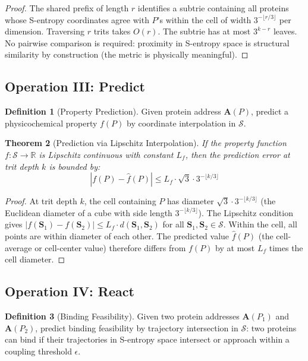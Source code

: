 \documentclass[11pt,twocolumn,a4paper]{article}
\newtheorem{theorem}{Theorem}[section]
\theoremstyle{definition}
\newtheorem{definition}[theorem]{Definition}
\theoremstyle{remark}
\newcommand{\Sspace}{\mathcal{S}}
\newcommand{\Real}{\mathbb{R}}
\begin{document}
\begin{proof}
The shared prefix of length $r$ identifies a subtrie containing all proteins whose S-entropy coordinates agree with $P$'s within the cell of width $3^{-\lfloor r/3 \rfloor}$ per dimension. Traversing $r$ trits takes $O(r)$. The subtrie has at most $3^{k-r}$ leaves. No pairwise comparison is required: proximity in S-entropy space is structural similarity by construction (the metric is physically meaningful).
\end{proof}

\subsection{Operation III: Predict}

\begin{definition}[Property Prediction]
\label{def:predict}
Given protein address $\mathbf{A}(P)$, predict a physicochemical property $f(P)$ by coordinate interpolation in $\Sspace$.
\end{definition}

\begin{theorem}[Prediction via Lipschitz Interpolation]
\label{thm:predict}
If the property function $f: \Sspace \to \Real$ is Lipschitz continuous with constant $L_f$, then the prediction error at trit depth $k$ is bounded by:
\begin{equation}
|f(P) - \hat{f}(P)| \leq L_f \cdot \sqrt{3} \cdot 3^{-\lfloor k/3 \rfloor}
\end{equation}
\end{theorem}

\begin{proof}
At trit depth $k$, the cell containing $P$ has diameter $\sqrt{3} \cdot 3^{-\lfloor k/3 \rfloor}$ (the Euclidean diameter of a cube with side length $3^{-\lfloor k/3 \rfloor}$). The Lipschitz condition gives $|f(\mathbf{S}_1) - f(\mathbf{S}_2)| \leq L_f \cdot d(\mathbf{S}_1, \mathbf{S}_2)$ for all $\mathbf{S}_1, \mathbf{S}_2 \in \Sspace$. Within the cell, all points are within diameter of each other. The predicted value $\hat{f}(P)$ (the cell-average or cell-center value) therefore differs from $f(P)$ by at most $L_f$ times the cell diameter.
\end{proof}

\subsection{Operation IV: React}

\begin{definition}[Binding Feasibility]
\label{def:react}
Given two protein addresses $\mathbf{A}(P_1)$ and $\mathbf{A}(P_2)$, predict binding feasibility by trajectory intersection in $\Sspace$: two proteins can bind if their trajectories in S-entropy space intersect or approach within a coupling threshold $\epsilon$.
\end{definition}
\end{document}
